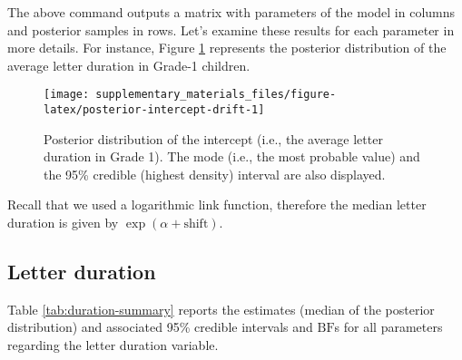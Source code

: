 \documentclass[
  11pt,
  english,
  ,doc,floatsintext]{apa6}
\newenvironment{Shaded}{}{}
\newcommand{\AttributeTok}[1]{\textcolor[rgb]{0.49,0.56,0.16}{#1}}
\newcommand{\CommentTok}[1]{\textcolor[rgb]{0.38,0.63,0.69}{\textit{#1}}}
\newcommand{\ConstantTok}[1]{\textcolor[rgb]{0.53,0.00,0.00}{#1}}
\newcommand{\FunctionTok}[1]{\textcolor[rgb]{0.02,0.16,0.49}{#1}}
\newcommand{\NormalTok}[1]{#1}
\newcommand{\OtherTok}[1]{\textcolor[rgb]{0.00,0.44,0.13}{#1}}
\newcommand{\SpecialCharTok}[1]{\textcolor[rgb]{0.25,0.44,0.63}{#1}}
\newcommand{\StringTok}[1]{\textcolor[rgb]{0.25,0.44,0.63}{#1}}
\begin{document}
The above command outputs a matrix with parameters of the model in columns and posterior samples in rows. Let's examine these results for each parameter in more details. For instance, Figure \ref{fig:posterior-intercept-drift} represents the posterior distribution of the average letter duration in Grade-1 children.

\begin{Shaded}
\end{Shaded}

\begin{figure}[!htb]

{\centering \texttt{[image: supplementary\_materials\_files/figure-latex/posterior-intercept-drift-1]} 

}

\caption{Posterior distribution of the intercept (i.e., the average letter duration in Grade 1). The mode (i.e., the most probable value) and the 95\% credible (highest density) interval are also displayed.}\label{fig:posterior-intercept-drift}
\end{figure}

Recall that we used a logarithmic link function, therefore the median letter duration is given by \(\exp(\alpha + \text{shift})\).

\hypertarget{letter-duration}{%
\subsection{Letter duration}\label{letter-duration}}

Table \ref{tab:duration-summary} reports the estimates (median of the posterior distribution) and associated 95\% credible intervals and \(\text{BF}\)s for all parameters regarding the letter duration variable.
\end{document}
